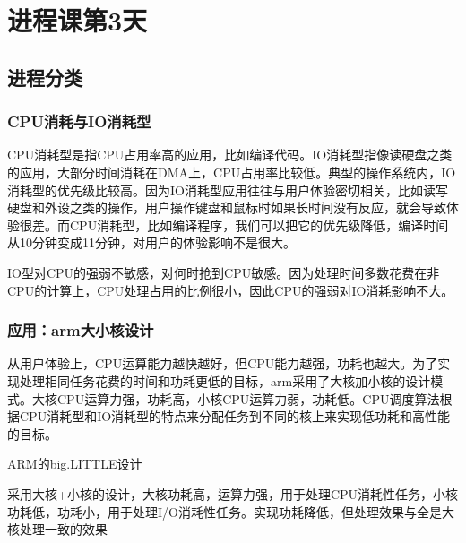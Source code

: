 


\part{进程课第3天}


\chapter{进程分类}


\section{CPU消耗与IO消耗型}
CPU消耗型是指CPU占用率高的应用，比如编译代码。IO消耗型指像读硬盘之类的应用，大部分时间消耗在DMA上，CPU占用率比较低。典型的操作系统内，IO消耗型的优先级比较高。因为IO消耗型应用往往与用户体验密切相关，比如读写硬盘和外设之类的操作，用户操作键盘和鼠标时如果长时间没有反应，就会导致体验很差。而CPU消耗型，比如编译程序，我们可以把它的优先级降低，编译时间从10分钟变成11分钟，对用户的体验影响不是很大。

IO型对CPU的强弱不敏感，对何时抢到CPU敏感。因为处理时间多数花费在非CPU的计算上，CPU处理占用的比例很小，因此CPU的强弱对IO消耗影响不大。

\section{应用：arm大小核设计}
从用户体验上，CPU运算能力越快越好，但CPU能力越强，功耗也越大。为了实现处理相同任务花费的时间和功耗更低的目标，arm采用了大核加小核的设计模式。大核CPU运算力强，功耗高，小核CPU运算力弱，功耗低。CPU调度算法根据CPU消耗型和IO消耗型的特点来分配任务到不同的核上来实现低功耗和高性能的目标。
\begin{example*}
  \wdexpbox
  {\caption{ARM的big.LITTLE设计}}
  {采用大核+小核的设计，大核功耗高，运算力强，用于处理CPU消耗性任务，小核功耗低，功耗小，用于处理I/O消耗性任务。实现功耗降低，但处理效果与全是大核处理一致的效果}
\end{example*}

